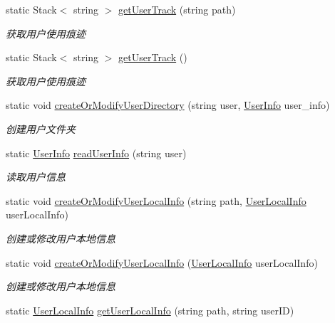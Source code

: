 \begin{DoxyCompactItemize}
static Stack$<$ string $>$ \hyperlink{classcustom__cloud_1_1_my_config_ac7e214c13ef859e4861e7e4b661cdad7}{get\+User\+Track} (string path)
\begin{DoxyCompactList}\small\item\em 获取用户使用痕迹 \end{DoxyCompactList}\item 
static Stack$<$ string $>$ \hyperlink{classcustom__cloud_1_1_my_config_a7e17aba0aeb5fddb695d54c282bfc2d0}{get\+User\+Track} ()
\begin{DoxyCompactList}\small\item\em 获取用户使用痕迹 \end{DoxyCompactList}\item 
static void \hyperlink{classcustom__cloud_1_1_my_config_ae7deca5a351332996c1685833569e93e}{create\+Or\+Modify\+User\+Directory} (string user, \hyperlink{classcustom__cloud_1_1_user_info}{User\+Info} user\+\_\+info)
\begin{DoxyCompactList}\small\item\em 创建用户文件夹 \end{DoxyCompactList}\item 
static \hyperlink{classcustom__cloud_1_1_user_info}{User\+Info} \hyperlink{classcustom__cloud_1_1_my_config_a699557050983d928c0014ac372a0eb2f}{read\+User\+Info} (string user)
\begin{DoxyCompactList}\small\item\em 读取用户信息 \end{DoxyCompactList}\item 
static void \hyperlink{classcustom__cloud_1_1_my_config_ac2e6062ba79088361a4e665e7b2d1130}{create\+Or\+Modify\+User\+Local\+Info} (string path, \hyperlink{classcustom__cloud_1_1_user_local_info}{User\+Local\+Info} user\+Local\+Info)
\begin{DoxyCompactList}\small\item\em 创建或修改用户本地信息 \end{DoxyCompactList}\item 
static void \hyperlink{classcustom__cloud_1_1_my_config_a979670e0bcb068c945cf047d68054b18}{create\+Or\+Modify\+User\+Local\+Info} (\hyperlink{classcustom__cloud_1_1_user_local_info}{User\+Local\+Info} user\+Local\+Info)
\begin{DoxyCompactList}\small\item\em 创建或修改用户本地信息 \end{DoxyCompactList}\item 
static \hyperlink{classcustom__cloud_1_1_user_local_info}{User\+Local\+Info} \hyperlink{classcustom__cloud_1_1_my_config_a370d7aec4951be84a21a17ff5e8f8d5e}{get\+User\+Local\+Info} (string path, string user\+ID)

\end{DoxyCompactItemize}
